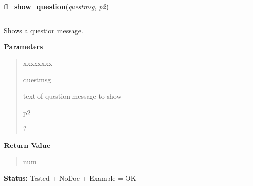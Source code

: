     \label{xformslib:library:fl_show_question}

    \vspace{0.5ex}

\hspace{.8\funcindent}\begin{boxedminipage}{\funcwidth}

    \raggedright \textbf{fl\_show\_question}(\textit{questmsg}, \textit{p2})

    \vspace{-1.5ex}

    \rule{\textwidth}{0.5\fboxrule}
\setlength{\parskip}{2ex}
    Shows a question message.

\setlength{\parskip}{1ex}
      \textbf{Parameters}
      \vspace{-1ex}

      \begin{quote}
        \begin{Ventry}{xxxxxxxx}

          \item[questmsg]

          text of question message to show

          \item[p2]

          ?

        \end{Ventry}

      \end{quote}

      \textbf{Return Value}
    \vspace{-1ex}

      \begin{quote}
      num

      \end{quote}

\textbf{Status:} Tested + NoDoc + Example = OK



    \end{boxedminipage}

    \label{xformslib:library:fl_hide_question}

    \vspace{0.5ex}

